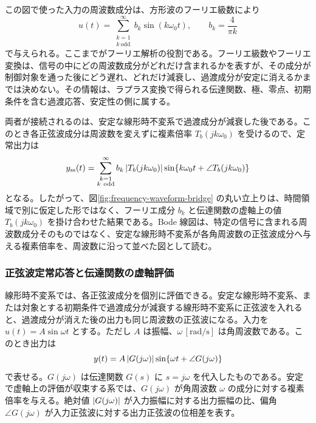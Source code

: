 この図で使った入力の周波数成分は、方形波のフーリエ級数により
\begin{equation}
  u(t)=\sum_{\substack{k=1\\k\ \mathrm{odd}}}^{\infty}
  b_k\sin(k\omega_0 t),
  \qquad
  b_k=\frac{4}{\pi k}
\end{equation}
で与えられる。ここまでがフーリエ解析の役割である。フーリエ級数やフーリエ変換は、信号の中にどの周波数成分がどれだけ含まれるかを表すが、その成分が制御対象を通った後にどう遅れ、どれだけ減衰し、過渡成分が安定に消えるかまでは決めない。その情報は、ラプラス変換で得られる伝達関数、極、零点、初期条件を含む過渡応答、安定性の側に属する。

両者が接続されるのは、安定な線形時不変系で過渡成分が減衰した後である。このとき各正弦波成分は周波数を変えずに複素倍率 $T_b(jk\omega_0)$ を受けるので、定常出力は
\begin{equation}
  y_{\mathrm{ss}}(t)
  =
  \sum_{\substack{k=1\\k\ \mathrm{odd}}}^{\infty}
  b_k\left|T_b(jk\omega_0)\right|
  \sin\{k\omega_0t+\angle T_b(jk\omega_0)\}
\end{equation}
となる。したがって、図\ref{fig:frequency-waveform-bridge} の丸い立上りは、時間領域で別に仮定した形ではなく、フーリエ成分 $b_k$ と伝達関数の虚軸上の値 $T_b(jk\omega_0)$ を掛け合わせた結果である。Bode 線図は、特定の信号に含まれる周波数成分そのものではなく、安定な線形時不変系が各角周波数の正弦波成分へ与える複素倍率を、周波数に沿って並べた図として読む。

\subsubsection{正弦波定常応答と伝達関数の虚軸評価}

線形時不変系では、各正弦波成分を個別に評価できる。安定な線形時不変系、または対象とする初期条件で過渡成分が減衰する線形時不変系に正弦波を入れると、過渡成分が消えた後の出力も同じ周波数の正弦波になる。入力を $u(t)=A\sin \omega t$ とする。ただし $A$ は振幅、$\omega\,[\mathrm{rad/s}]$ は角周波数である。このとき出力は
\begin{equation}
  y(t)=A\left|G(j\omega)\right|\sin\{\omega t+\angle G(j\omega)\}
\end{equation}
で表せる。$G(j\omega)$ は伝達関数 $G(s)$ に $s=j\omega$ を代入したものである。安定で虚軸上の評価が収束する系では、$G(j\omega)$ が角周波数 $\omega$ の成分に対する複素倍率を与える。絶対値 $\left|G(j\omega)\right|$ が入力振幅に対する出力振幅の比、偏角 $\angle G(j\omega)$ が入力正弦波に対する出力正弦波の位相差を表す。

